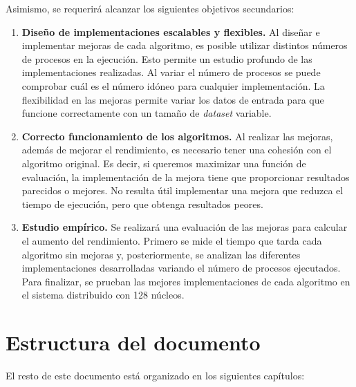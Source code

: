 	Asimismo, se requerirá alcanzar los siguientes objetivos secundarios:
	
	\begin{enumerate}
		\item \textbf{Diseño de implementaciones escalables y flexibles.} Al diseñar e implementar mejoras de cada algoritmo, es posible utilizar distintos números de procesos en la ejecución. Esto permite un estudio profundo de las implementaciones realizadas. Al variar el número de procesos se puede comprobar cuál es el número idóneo para cualquier implementación. La flexibilidad en las mejoras permite variar los datos de entrada para que funcione correctamente con un tamaño de \textit{dataset} variable.
		\item \textbf{Correcto funcionamiento de los algoritmos.} Al realizar las mejoras, además de mejorar el rendimiento, es necesario tener una cohesión con el algoritmo original. Es decir, si queremos maximizar una función de evaluación, la implementación de la mejora tiene que proporcionar resultados parecidos o mejores. No resulta útil implementar una mejora que reduzca el tiempo de ejecución, pero que obtenga resultados peores.
		\item \textbf{Estudio empírico.} Se realizará una evaluación de las mejoras para calcular el aumento del rendimiento. Primero se mide el tiempo que tarda cada algoritmo sin mejoras y, posteriormente, se analizan las diferentes implementaciones desarrolladas variando el número de procesos ejecutados. Para finalizar, se prueban las mejores implementaciones de cada algoritmo en el sistema distribuido con 128 núcleos.
	\end{enumerate}





\section{Estructura del documento}
	El resto de este documento está organizado en los siguientes capítulos:
	
